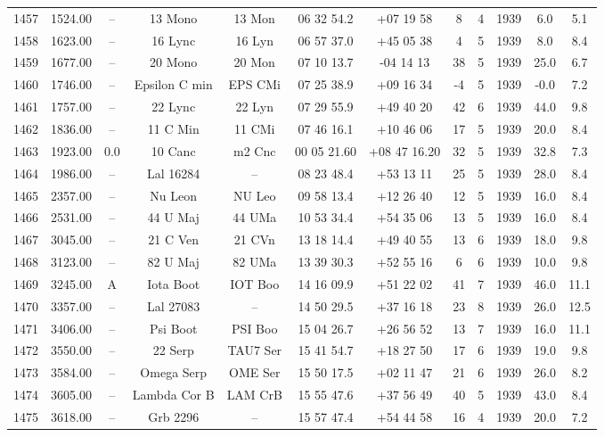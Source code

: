 \begin{table}
\begin{tabular}{cccccccccccc}
1457 & 1524.00 & -- & 13 Mono & 13 Mon & 06 32 54.2 & +07 19 58 & 8 & 4 & 1939 & 6.0 & 5.1 \\
1458 & 1623.00 & -- & 16 Lync & 16 Lyn & 06 57 37.0 & +45 05 38 & 4 & 5 & 1939 & 8.0 & 8.4 \\
1459 & 1677.00 & -- & 20 Mono & 20 Mon & 07 10 13.7 & -04 14 13 & 38 & 5 & 1939 & 25.0 & 6.7 \\
1460 & 1746.00 & -- & Epsilon C min & EPS CMi & 07 25 38.9 & +09 16 34 & -4 & 5 & 1939 & -0.0 & 7.2 \\
1461 & 1757.00 & -- & 22 Lync & 22 Lyn & 07 29 55.9 & +49 40 20 & 42 & 6 & 1939 & 44.0 & 9.8 \\
1462 & 1836.00 & -- & 11 C Min & 11 CMi & 07 46 16.1 & +10 46 06 & 17 & 5 & 1939 & 20.0 & 8.4 \\
1463 & 1923.00 & 0.0 & 10 Canc & m2 Cnc & 00 05 21.60 & +08 47 16.20 & 32 & 5 & 1939 & 32.8 & 7.3 \\
1464 & 1986.00 & -- & Lal 16284 & -- & 08 23 48.4 & +53 13 11 & 25 & 5 & 1939 & 28.0 & 8.4 \\
1465 & 2357.00 & -- & Nu Leon & NU Leo & 09 58 13.4 & +12 26 40 & 12 & 5 & 1939 & 16.0 & 8.4 \\
1466 & 2531.00 & -- & 44 U Maj & 44 UMa & 10 53 34.4 & +54 35 06 & 13 & 5 & 1939 & 16.0 & 8.4 \\
1467 & 3045.00 & -- & 21 C Ven & 21 CVn & 13 18 14.4 & +49 40 55 & 13 & 6 & 1939 & 18.0 & 9.8 \\
1468 & 3123.00 & -- & 82 U Maj & 82 UMa & 13 39 30.3 & +52 55 16 & 6 & 6 & 1939 & 10.0 & 9.8 \\
1469 & 3245.00 & A & Iota Boot & IOT Boo & 14 16 09.9 & +51 22 02 & 41 & 7 & 1939 & 46.0 & 11.1 \\
1470 & 3357.00 & -- & Lal 27083 & -- & 14 50 29.5 & +37 16 18 & 23 & 8 & 1939 & 26.0 & 12.5 \\
1471 & 3406.00 & -- & Psi Boot & PSI Boo & 15 04 26.7 & +26 56 52 & 13 & 7 & 1939 & 16.0 & 11.1 \\
1472 & 3550.00 & -- & 22 Serp & TAU7 Ser & 15 41 54.7 & +18 27 50 & 17 & 6 & 1939 & 19.0 & 9.8 \\
1473 & 3584.00 & -- & Omega Serp & OME Ser & 15 50 17.5 & +02 11 47 & 21 & 6 & 1939 & 26.0 & 8.2 \\
1474 & 3605.00 & -- & Lambda Cor B & LAM CrB & 15 55 47.6 & +37 56 49 & 40 & 5 & 1939 & 43.0 & 8.4 \\
1475 & 3618.00 & -- & Grb 2296 & -- & 15 57 47.4 & +54 44 58 & 16 & 4 & 1939 & 20.0 & 7.2 \\

\end{tabular}
\end{table}
